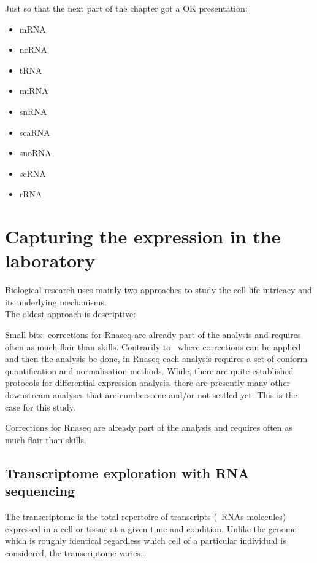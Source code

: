 Just so that the next part of the chapter got a OK presentation:
\begin{itemize}
    \item \gls{mRNA}
    \item \gls{ncRNA}
    \item \gls{tRNA}
    \item \gls{miRNA}
    \item \gls{snRNA}
    \item \gls{scaRNA}
    \item \gls{snoRNA}
    \item \gls{scRNA}
    \item \gls{rRNA}
\end{itemize}



\section{Capturing the expression in the laboratory}

Biological research uses mainly two approaches to
study the cell life intricacy and its underlying mechanisms.\\
The oldest approach is descriptive:


Small bits: corrections for Rnaseq are already part of the analysis and
requires often as much flair than skills.
Contrarily to \Dnaseq\ where corrections can be applied  and
then the analysis be done, in Rnaseq each analysis requires a set of conform
quantification and normalisation methods.
While, there are quite established protocols for differential expression analysis,
there are presently many other downstream analyses that are cumbersome
and/or not settled yet. This is the case for this study.


Corrections for Rnaseq are already part of the analysis and
requires often as much flair than skills.

\subsection{Transcriptome exploration with RNA sequencing}

The transcriptome is the total repertoire of transcripts (\ie\ \glspl{RNA}
molecules) expressed in a cell or tissue at a given time and condition. Unlike
the genome which is roughly identical regardless which cell of a particular
individual is considered, the transcriptome varies\ldots




